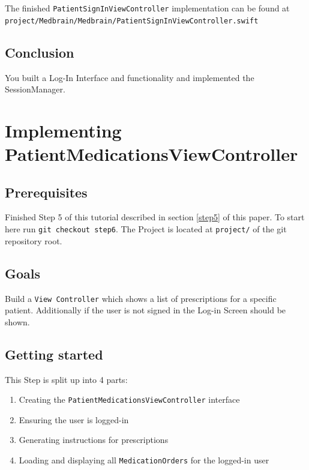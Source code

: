 \documentclass{article}
\begin{document}
The finished \texttt{PatientSignInViewController} implementation can be
found at \texttt{project/Medbrain/Medbrain/PatientSignInViewController.swift}

\subsection{Conclusion}\label{step5:conclusion}

You built a Log-In Interface and functionality and implemented the
SessionManager.

\section{Implementing PatientMedicationsViewController}\label{step6}

\subsection{Prerequisites}\label{step6:prerequisites}
Finished Step 5 of this tutorial described in section \ref{step5} of this paper.
To start here run \texttt{git checkout step6}.
The Project is located at \texttt{project/} of the git repository root.

\subsection{Goals}\label{step6:goals}

Build a \texttt{View\ Controller} which shows a list of prescriptions
for a specific patient. Additionally if the user is not signed in the
Log-in Screen should be shown.

\subsection{Getting started}\label{step6:getting-started}

This Step is split up into 4 parts:

\begin{enumerate}
  \item
    Creating the \texttt{PatientMedicationsViewController} interface
  \item
    Ensuring the user is logged-in
  \item
    Generating instructions for prescriptions
  \item
    Loading and displaying all \texttt{MedicationOrders} for the logged-in user
\end{enumerate}
\end{document}
